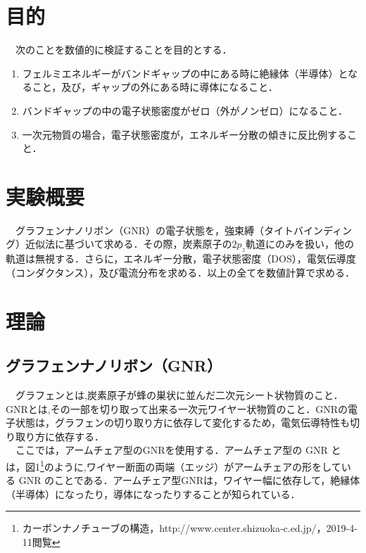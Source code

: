 

\pagestyle{fancy}

\section{目的}
　次のことを数値的に検証することを目的とする．
\begin{enumerate}
  \item フェルミエネルギーがバンドギャップの中にある時に絶縁体（半導体）となること，及び，ギャップの外にある時に導体になること．
  \item バンドギャップの中の電子状態密度がゼロ（外がノンゼロ）になること．
  \item 一次元物質の場合，電子状態密度が，エネルギー分散の傾きに反比例すること．
\end{enumerate}

\section{実験概要}
　グラフェンナノリボン（GNR）の電子状態を，強束縛（タイトバインディング）近似法に基づいて求める．その際，炭素原子の$2p_z$軌道にのみを扱い，他の軌道は無視する．さらに，エネルギー分散，電子状態密度（DOS），電気伝導度（コンダクタンス），及び電流分布を求める．以上の全てを数値計算で求める．

\section{理論}
\subsection{グラフェンナノリボン（GNR）}
　グラフェンとは,炭素原子が蜂の巣状に並んだ二次元シート状物質のこと．GNRとは,その一部を切り取って出来る一次元ワイヤー状物質のこと．GNRの電子状態は，グラフェンの切り取り方に依存して変化するため，電気伝導特性も切り取り方に依存する．\\

　ここでは，アームチェア型のGNRを使用する．アームチェア型の GNR とは，図1\footnote{カーボンナノチューブの構造，http://www.center.shizuoka-c.ed.jp/，2019-4-11閲覧}のように,ワイヤー断面の両端（エッジ）がアームチェアの形をしている GNR のことである．アームチェア型GNRは，ワイヤー幅に依存して，絶縁体（半導体）になったり，導体になったりすることが知られている．

